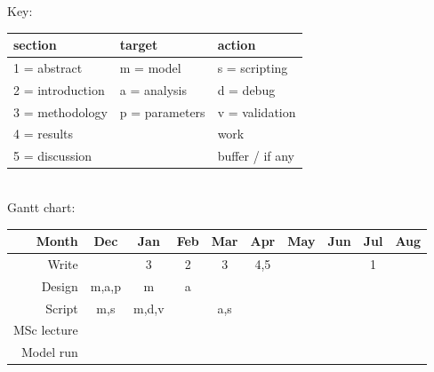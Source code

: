 \documentclass[a4paper, 11pt]{article}
\begin{document}
Key:
\begin{tabular}{lll}
	section & target & action\\\hline
	1 = abstract & m = model & s = scripting\\
	2 = introduction & a = analysis & d = debug\\
	3 = methodology & p = parameters & v = validation\\
	4 = results && \cellcolor{grey90}work\\
	5 = discussion && \cellcolor{lorange}buffer / if any\\
\end{tabular}\\
Gantt chart:
\begin{tabular}{r|ccccccccc}
	Month		&Dec						&Jan						&Feb					&Mar					&Apr					&May				&Jun					&Jul					&Aug				\\\hline
	Write		&							&\cellcolor{grey90}3		&\cellcolor{grey90}2	&\cellcolor{lorange}3	&\cellcolor{grey90}4,5	&\cellcolor{grey90}	&\cellcolor{grey90}		&\cellcolor{grey90}1	&\cellcolor{lorange}\\
	Design		&\cellcolor{grey90}m,a,p	&\cellcolor{grey90}m		&\cellcolor{grey90}a	&\cellcolor{lorange}	&						&					&						&						&					\\
	Script		&\cellcolor{grey90}m,s		&\cellcolor{grey90}m,d,v	&						&\cellcolor{grey90}a,s	&\cellcolor{grey90}		&\cellcolor{grey90}	&\cellcolor{lorange}	&						&					\\
	MSc lecture	&\cellcolor{lorange}		&\cellcolor{lorange}		&\cellcolor{lorange}	&\cellcolor{lorange}	&						&					&						&						&					\\
	Model run 	&							&\cellcolor{grey90}			&\cellcolor{grey90}		&\cellcolor{grey90}		&\cellcolor{grey90}		&\cellcolor{grey90}	&\cellcolor{lorange}	&\cellcolor{lorange}	&\cellcolor{lorange}\\
\end{tabular}
\end{document}
